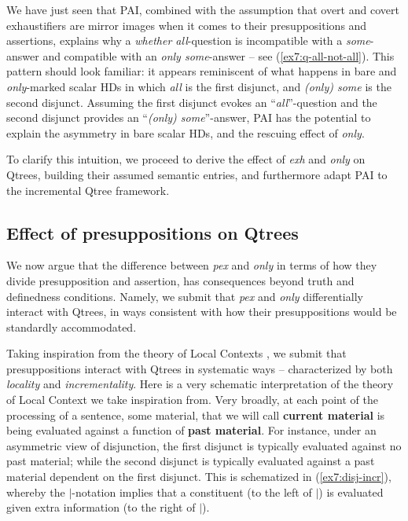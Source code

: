 We have just seen that PAI, combined with the assumption that overt and covert exhaustifiers are mirror images when it comes to their presuppositions and assertions, explains why a \textit{whether all}-question is incompatible with a \textit{some}-answer and compatible with an \textit{only some}-answer -- see (\ref{ex7:q-all-not-all}). This pattern should look familiar: it appears reminiscent of what happens in bare and \textit{only}-marked scalar HDs in which \textit{all} is the first disjunct, and \textit{(only) some} is the second disjunct. Assuming the first disjunct evokes an ``\textit{all}''-question and the second disjunct provides an ``\textit{(only) some}''-answer, PAI has the potential to explain the asymmetry in bare scalar HDs, and the rescuing effect of \textit{only}.

To clarify this intuition, we proceed to derive the effect of \textit{exh} and \textit{only} on Qtrees, building their assumed semantic entries, and furthermore adapt PAI to the incremental Qtree framework.


\subsection{Effect of presuppositions on Qtrees}

We now argue that the difference between \textit{pex} and \textit{only} in terms of how they divide presupposition and assertion, has consequences beyond truth and definedness conditions. Namely, we submit that \textit{pex} and \textit{only} differentially interact with Qtrees, in ways consistent with how their presuppositions would be standardly accommodated.

Taking inspiration from the theory of Local Contexts \parencite{Schlenker2009}, we submit that presuppositions interact with Qtrees in systematic ways -- characterized by both \textit{locality} and \textit{incrementality}. Here is a very schematic interpretation of the theory of Local Context we take inspiration from. Very broadly, at each point of the processing of a sentence, some material, that we will call \textbf{current material} is being evaluated against a function of \textbf{past material}. For instance, under an asymmetric view of disjunction, the first disjunct is typically evaluated against no past material; while the second disjunct is typically evaluated against a past material dependent on the first disjunct. This is schematized in (\ref{ex7:disj-incr}), whereby the $|$-notation implies that a constituent (to the left of $|$) is evaluated given extra information (to the right of $|$).


